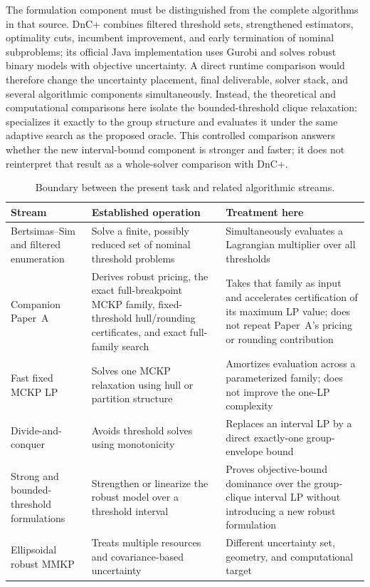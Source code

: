 \documentclass[11pt]{article}
\theoremstyle{plain}
\theoremstyle{definition}
\theoremstyle{remark}
\begin{document}
The formulation component must be distinguished from the complete algorithms in that source.  DnC+ combines filtered threshold sets, strengthened estimators, optimality cuts, incumbent improvement, and early termination of nominal subproblems; its official Java implementation uses Gurobi and solves robust binary models with objective uncertainty.  A direct runtime comparison would therefore change the uncertainty placement, final deliverable, solver stack, and several algorithmic components simultaneously.  Instead, the theoretical and computational comparisons here isolate the bounded-threshold clique relaxation:  specializes it exactly to the group structure and evaluates it under the same adaptive search as the proposed oracle.  This controlled comparison answers whether the new interval-bound component is stronger and faster; it does not reinterpret that result as a whole-solver comparison with DnC+.

\begin{table}[t]
\centering
\caption{Boundary between the present task and related algorithmic streams.}
\label{tab:prior-art}
\small
\renewcommand{\arraystretch}{1.18}
\begin{tabular}{>{\raggedright\arraybackslash}p{}>{\raggedright\arraybackslash}p{}>{\raggedright\arraybackslash}p{}}
\toprule
Stream & Established operation & Treatment here \\
\midrule
Bertsimas--Sim and filtered enumeration & Solve a finite, possibly reduced set of nominal threshold problems & Simultaneously evaluates a Lagrangian multiplier over all thresholds \\\addlinespace[4pt]
Companion Paper~A \citep{Shao2026PaperA} & Derives robust pricing, the exact full-breakpoint MCKP family, fixed-threshold hull/rounding certificates, and exact full-family search & Takes that family as input and accelerates certification of its maximum LP value; does not repeat Paper~A's pricing or rounding contribution \\\addlinespace[4pt]
Fast fixed MCKP LP & Solves one MCKP relaxation using hull or partition structure & Amortizes evaluation across a parameterized family; does not improve the one-LP complexity \\\addlinespace[4pt]
Divide-and-conquer & Avoids threshold solves using monotonicity & Replaces an interval LP by a direct exactly-one group-envelope bound \\\addlinespace[4pt]
Strong and bounded-threshold formulations & Strengthen or linearize the robust model over a threshold interval & Proves objective-bound dominance over the group-clique interval LP without introducing a new robust formulation \\\addlinespace[4pt]
Ellipsoidal robust MMKP \citep{Caserta2019} & Treats multiple resources and covariance-based uncertainty & Different uncertainty set, geometry, and computational target \\
\bottomrule
\end{tabular}
\end{table}
\end{document}
